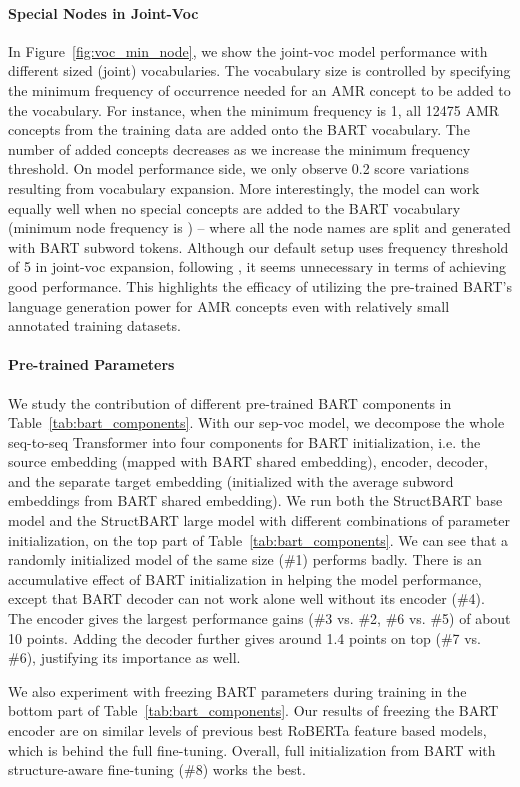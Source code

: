 \paragraph{Special Nodes in Joint-Voc}

In Figure~\ref{fig:voc_min_node},
we show the joint-voc model performance with different sized (joint) vocabularies. The vocabulary size is controlled by specifying the minimum frequency of occurrence needed for an AMR concept to be added to the vocabulary.
For instance, when the minimum frequency is 1, all 12475 AMR concepts from the training data are added onto the BART vocabulary. The number of added concepts decreases as we increase the minimum  frequency threshold. On model performance side, we only observe 0.2 score variations resulting from vocabulary expansion. More interestingly, the model can work equally well when no special concepts are added to the BART vocabulary (minimum node frequency is ) -- where all the node names are split and generated with BART subword tokens.
Although our default setup uses frequency threshold of 5 in joint-voc expansion, following \citet{bevilacqua2021one}, it seems unnecessary in terms of achieving good performance.
This highlights the efficacy of utilizing the pre-trained BART's language generation power for AMR concepts even with relatively small annotated training datasets.



\paragraph{Pre-trained Parameters}

We study the contribution of different pre-trained BART components in Table~\ref{tab:bart_components}. With our sep-voc model, we decompose the whole seq-to-seq Transformer into four components for BART initialization, i.e. the source embedding (mapped with BART shared embedding), encoder, decoder, and the separate target embedding (initialized with the average subword embeddings from BART shared embedding). We run both the StructBART base model and the StructBART large model with different combinations of parameter initialization, on the top part of Table~\ref{tab:bart_components}.
We can see that a randomly initialized model of the same size (\#1) performs badly.
There is an accumulative effect of BART initialization in helping the model performance, except that BART decoder can not work alone well without its encoder (\#4).
The encoder gives the largest performance gains (\#3 vs. \#2, \#6 vs. \#5) of about 10 points.
Adding the decoder further gives around 1.4 points on top (\#7 vs. \#6), justifying its importance as well.

We also experiment with freezing BART parameters during training in the bottom part of Table~\ref{tab:bart_components}.
Our results of freezing the BART encoder are on similar levels of previous best RoBERTa feature based models, which is behind the full fine-tuning.
Overall, full initialization from BART with structure-aware fine-tuning (\#8) works the best.
